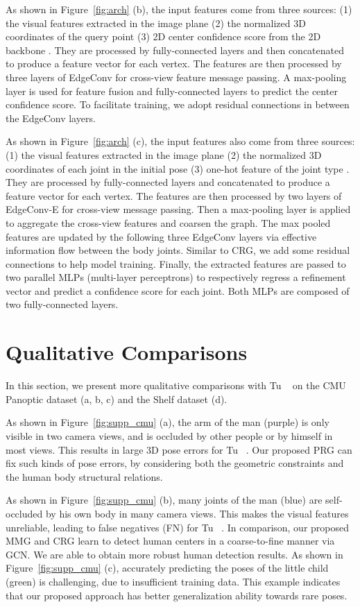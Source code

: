 \documentclass[10pt,twocolumn,letterpaper]{article}
\begin{document}
As shown in Figure~\ref{fig:arch} (b), the input features come from three sources:
(1) the visual features  extracted in the image plane (2) the normalized 3D coordinates  of the query point (3) 2D center confidence score from the 2D backbone  . They are processed by fully-connected layers and then concatenated to produce a feature vector  for each vertex. The features are then processed by three layers of EdgeConv for cross-view feature message passing. A max-pooling layer is used for feature fusion and fully-connected layers to predict the center confidence score. To facilitate training, we adopt residual connections in between the EdgeConv layers.

As shown in Figure~\ref{fig:arch} (c), the input features also come from three sources: (1) the visual features  extracted in the image plane (2) the normalized 3D coordinates  of each joint in the initial pose (3) one-hot feature of the joint type . They are processed by fully-connected layers and concatenated to produce a feature vector  for each vertex. The features are then processed by two layers of EdgeConv-E for cross-view message passing. Then a max-pooling layer is applied to aggregate the cross-view features and coarsen the graph. The max pooled features are updated by the following three EdgeConv layers via effective information flow between the body joints. Similar to CRG, we add some residual connections to help model training. Finally, the extracted features are passed to two parallel MLPs (multi-layer perceptrons) to respectively regress a refinement vector and predict a confidence score for each joint. Both MLPs are composed of two fully-connected layers.


\section{Qualitative Comparisons}

In this section, we present more qualitative comparisons with Tu \etal~\cite{tu2020voxelpose} on the CMU Panoptic dataset (a, b, c) and the Shelf dataset (d).

As shown in Figure~\ref{fig:supp_cmu} (a), the arm of the man (purple) is only visible in two camera views, and is occluded by other people or by himself in most views. This results in large 3D pose errors for Tu \etal~\cite{tu2020voxelpose}. Our proposed PRG can fix such kinds of pose errors, by considering both the geometric constraints and the human body structural relations. 

As shown in Figure~\ref{fig:supp_cmu} (b), many joints of the man (blue) are self-occluded by his own body in many camera views. This makes the visual features unreliable, leading to false negatives (FN) for Tu \etal~\cite{tu2020voxelpose}. In comparison, our proposed MMG and CRG learn to detect human centers in a coarse-to-fine manner via GCN. We are able to obtain more robust human detection results. 
As shown in Figure~\ref{fig:supp_cmu} (c), accurately predicting the poses of the little child (green) is challenging, due to insufficient training data. This example indicates that our proposed approach has better generalization ability towards rare poses.
\end{document}
